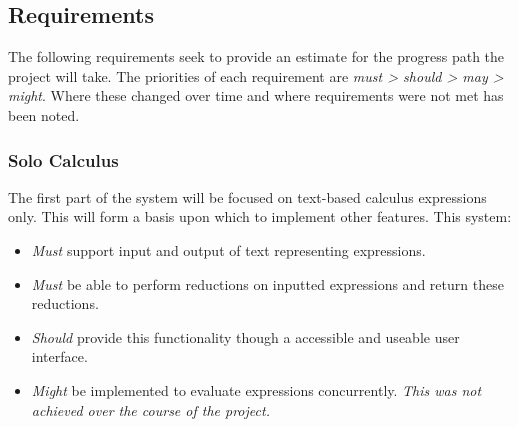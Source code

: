 \subsection{Requirements}
    
    The following requirements seek to provide an estimate for the progress path the project will take.
    The priorities of each requirement are \textit{must > should > may > might}.
    Where these changed over time and where requirements were not met has been noted.
   
    \subsubsection{Solo Calculus}
        The first part of the system will be focused on text-based calculus expressions only.
        This will form a basis upon which to implement other features.
        This system:
        \begin{itemize}
            \item \textit{Must} support input and output of text representing expressions.
            \item \textit{Must} be able to perform reductions on inputted expressions and return these reductions.
            \item \textit{Should} provide this functionality though a accessible and useable user interface.
            \item \textit{Might} be implemented to evaluate expressions concurrently.
                \textit{This was not achieved over the course of the project.}
        \end{itemize}

